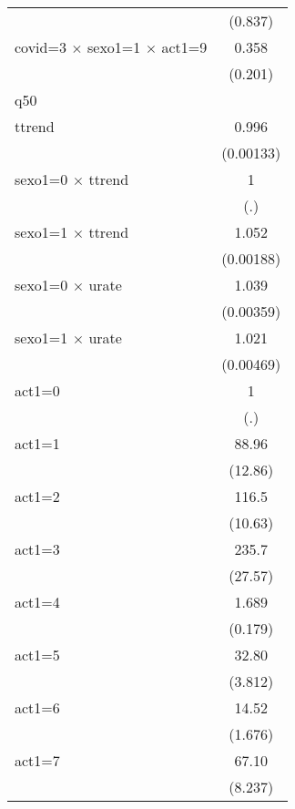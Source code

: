 {\begin{tabular}{l*{1}{c}}
                    &     (0.837)         \\
[1em]
covid=3 $\times$ sexo1=1 $\times$ act1=9&       0.358         \\
                    &     (0.201)         \\
\hline
q50                 &                     \\
ttrend              &       0.996\sym{**} \\
                    &   (0.00133)         \\
[1em]
sexo1=0 $\times$ ttrend&           1         \\
                    &         (.)         \\
[1em]
sexo1=1 $\times$ ttrend&       1.052\sym{***}\\
                    &   (0.00188)         \\
[1em]
sexo1=0 $\times$ urate&       1.039\sym{***}\\
                    &   (0.00359)         \\
[1em]
sexo1=1 $\times$ urate&       1.021\sym{***}\\
                    &   (0.00469)         \\
[1em]
act1=0              &           1         \\
                    &         (.)         \\
[1em]
act1=1              &       88.96\sym{***}\\
                    &     (12.86)         \\
[1em]
act1=2              &       116.5\sym{***}\\
                    &     (10.63)         \\
[1em]
act1=3              &       235.7\sym{***}\\
                    &     (27.57)         \\
[1em]
act1=4              &       1.689\sym{***}\\
                    &     (0.179)         \\
[1em]
act1=5              &       32.80\sym{***}\\
                    &     (3.812)         \\
[1em]
act1=6              &       14.52\sym{***}\\
                    &     (1.676)         \\
[1em]
act1=7              &       67.10\sym{***}\\
                    &     (8.237)         \\

\end{tabular}}
